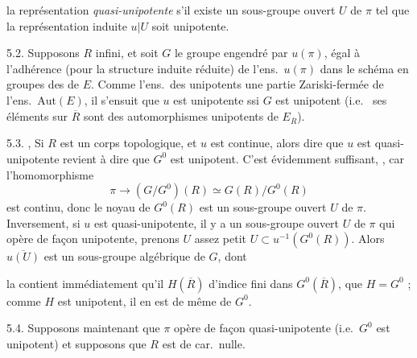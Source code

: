 \documentclass[11pt,a4paper]{article}
\begin{document}
la représentation \emph{quasi-unipotente} s'il existe un sous-groupe ouvert $U$ de $\pi$ tel que la représentation induite $u|U$ soit unipotente.

5.2. Supposons $R$ infini, et soit $G$ le groupe  engendré par $u(\pi)$,  égal à l'adhérence (pour la structure induite réduite) de l'ens.\ $u(\pi)$ dans le schéma en groupes des \struck{\ill{}}  de $E$. Comme l'ens.\ des \struck{\ill{}}  unipotents  une partie Zariski-fermée de l'ens.\ $\mathrm{Aut}(E)$, il s'ensuit que $u$ est unipotente ssi $G$ est unipotent (i.e.\  ses éléments sur $\overline{R}$ sont des automorphismes unipotents de $E_{\overline{R}}$).


5.3. , Si $R$ est un corps topologique, et $u$ est continue, alors dire que $u$ est quasi-unipotente revient à dire que $G^{0}$ est unipotent. C'est évidemment suffisant, , car l'homomorphisme
\[ \pi \longrightarrow (G/G^{0})(R) \simeq G(R)/G^{0}(R) \]
est continu, donc le noyau  de $G^{0}(R)$ est un sous-groupe ouvert $U$ de $\pi$. Inversement, si $u$ est quasi-unipotente, il y a un sous-groupe ouvert $U$ de $\pi$ qui opère de façon unipotente, prenons $U$ assez petit \ill{} $U \subset u^{-1}(G^{0}(R))$. Alors $\overline{u(U)}$ est un sous-groupe algébrique  de $G$, dont


la contient immédiatement qu'il  \struck{\ill{}}  \ill{} $H(\overline{R})$ d'indice fini dans $G^{0}(\overline{R})$,  que $H = G^{0}$ ;  comme $H$ est unipotent, il en est de même de $G^{0}$.


5.4. Supposons maintenant que $\pi$ opère de façon quasi-unipotente (i.e.\ $G^{0}$ est unipotent) et supposons que $R$ est de car.\ nulle.  \ill{} \struck{\ill{}}
\end{document}
